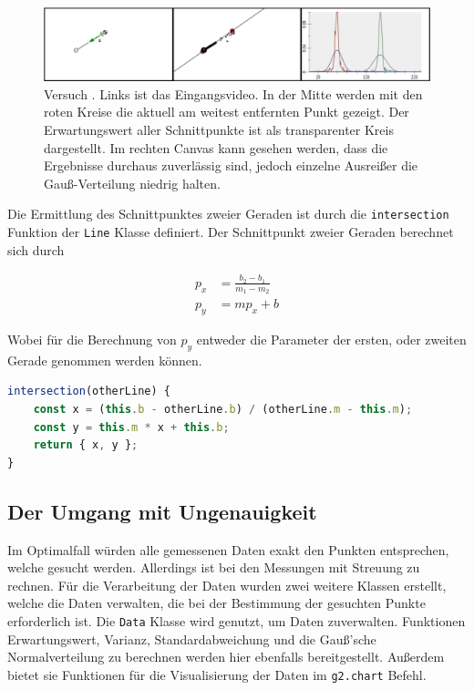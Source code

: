 \begin{figure}
    \centering
    \includegraphics[width=\textwidth]{gfx/pendel2_1.png}
    \caption[Versuch ]{Versuch . Links ist das Eingangsvideo. In der Mitte werden mit den roten Kreise die aktuell am weitest entfernten Punkt gezeigt. Der Erwartungswert aller Schnittpunkte ist als transparenter Kreis dargestellt. Im rechten Canvas kann gesehen werden, dass die Ergebnisse durchaus zuverlässig sind, jedoch einzelne Ausrei{\ss}er die Gau{\ss}-Verteilung niedrig halten.}
    \label{fig:pendel2_1}
\end{figure}

Die Ermittlung des Schnittpunktes zweier Geraden ist durch die \lstinline{intersection} Funktion der \lstinline{Line} Klasse definiert.
Der Schnittpunkt zweier Geraden berechnet sich durch

\begin{equation}
    \begin{split}
        p_x &= \frac{b_2 - b_1}{m_1 - m_2} \\
        p_y &= m p_x + b
    \end{split}
    \label{eq:schnittpunkt}
\end{equation}

Wobei für die Berechnung von $p_y$ entweder die Parameter der ersten, oder zweiten Gerade genommen werden können.

\begin{lstlisting}[language=JavaScript, caption={Definition der \lstinline{intersection} Funktion, welche eine Funktion der \lstinline{Line} Klasse darstellt.}, label={lst:line_intersection}]
intersection(otherLine) {
    const x = (this.b - otherLine.b) / (otherLine.m - this.m);
    const y = this.m * x + this.b;
    return { x, y };
}
\end{lstlisting}

\subsection{Der Umgang mit Ungenauigkeit}

Im Optimalfall würden alle gemessenen Daten exakt den Punkten entsprechen, welche gesucht werden.
Allerdings ist bei den Messungen mit Streuung zu rechnen.
Für die Verarbeitung der Daten wurden zwei weitere Klassen erstellt, welche die Daten verwalten, die bei der Bestimmung der gesuchten Punkte erforderlich ist.
Die \lstinline{Data} Klasse wird genutzt, um Daten zuverwalten.
Funktionen Erwartungswert, Varianz, Standardabweichung und die Gau{\ss}'sche Normalverteilung zu berechnen werden hier ebenfalls bereitgestellt.
Au{\ss}erdem bietet sie Funktionen für die Visualisierung der Daten im \lstinline{g2.chart} Befehl.

